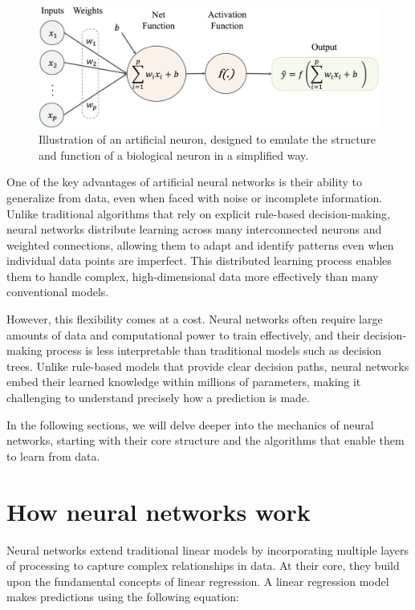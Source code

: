 \documentclass[
  11pt,
]{book}
\theoremstyle{definition}
\theoremstyle{definition}
\theoremstyle{definition}
\theoremstyle{definition}
\theoremstyle{remark}
\begin{document}
\begin{figure}[H]

{\centering \includegraphics[width=0.9\linewidth]{images/ch12_net_1} 

}

\caption{Illustration of an artificial neuron, designed to emulate the structure and function of a biological neuron in a simplified way.}\label{fig:net-1}
\end{figure}

One of the key advantages of artificial neural networks is their ability to generalize from data, even when faced with noise or incomplete information. Unlike traditional algorithms that rely on explicit rule-based decision-making, neural networks distribute learning across many interconnected neurons and weighted connections, allowing them to adapt and identify patterns even when individual data points are imperfect. This distributed learning process enables them to handle complex, high-dimensional data more effectively than many conventional models.

However, this flexibility comes at a cost. Neural networks often require large amounts of data and computational power to train effectively, and their decision-making process is less interpretable than traditional models such as decision trees. Unlike rule-based models that provide clear decision paths, neural networks embed their learned knowledge within millions of parameters, making it challenging to understand precisely how a prediction is made.

In the following sections, we will delve deeper into the mechanics of neural networks, starting with their core structure and the algorithms that enable them to learn from data.

\section{How neural networks work}\label{how-neural-networks-work}

Neural networks extend traditional linear models by incorporating multiple layers of processing to capture complex relationships in data. At their core, they build upon the fundamental concepts of linear regression. A linear regression model makes predictions using the following equation:
\end{document}
